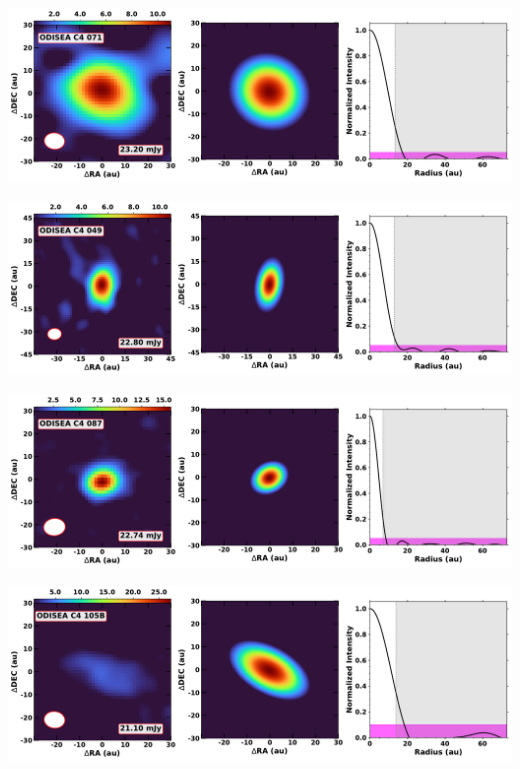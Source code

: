 \vspace{0pt}
\begin{minipage}{.49\textwidth}
	 \centering
	 	 \hrulesep
	 	 \includegraphics[width=1\linewidth]{pdf/0+I_F/029_odisea_c4_071_cutout.pdf}
\end{minipage}%
\vrulesep
\begin{minipage}{.49\textwidth}
	 \centering
	 	 \hrulesep
	 	 \includegraphics[width=1\linewidth]{pdf/0+I_F/028_odisea_c4_049_cutout.pdf}
\end{minipage}%
\vspace{0pt}
\begin{minipage}{.49\textwidth}
	 \centering
	 	 \hrulesep
	 	 \includegraphics[width=1\linewidth]{pdf/0+I_F/027_odisea_c4_087_cutout.pdf}
\end{minipage}%
\vrulesep
\begin{minipage}{.49\textwidth}
	 \centering
	 	 \hrulesep
	 	 \includegraphics[width=1\linewidth]{pdf/0+I_F/026_odisea_c4_105b_cutout.pdf}
\end{minipage}%
